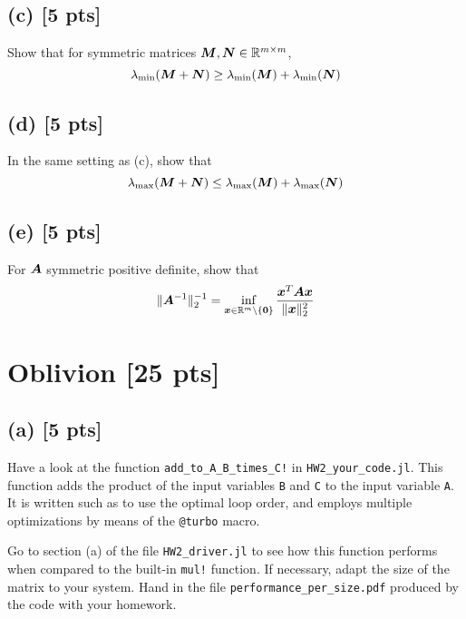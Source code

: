 \documentclass[twoside,10pt]{article}
\begin{document}
\subsection*{(c) [5 pts]}

Show that for symmetric matrices $\bm{M}, \bm{N} \in \mathbb{R}^{m \times m}$, 
\begin{equation}
  \lambda_{\mathrm{min}}(\mtx{M} + \mtx{N}) \geq \lambda_{\mathrm{min}}\left(\mtx{M}\right) + \lambda_{\mathrm{min}}\left(\mtx{N}\right)
\end{equation}


\subsection*{(d) [5 pts]}
In the same setting as (c), show that 
\begin{equation}
  \lambda_{\mathrm{max}}(\mtx{M} + \mtx{N}) \leq \lambda_{\mathrm{max}}\left(\mtx{M}\right) + \lambda_{\mathrm{max}}\left(\mtx{N}\right)
\end{equation}


\subsection*{(e) [5 pts]}
For $\bm{A}$ symmetric positive definite, show that 
\begin{equation*}
  \|\bm{A}^{-1}\|_{2}^{-1} = \inf \limits_{\bm{x} \in \mathbb{R}^m \setminus \{\bm{0}\}} \frac{\bm{x}^T \bm{A} \bm{x}}{\|\bm{x}\|^2_2}
\end{equation*}

\section{Oblivion [25 pts]}
\subsection*{(a) [5 pts]} 
Have a look at the function \texttt{add\_to\_A\_B\_times\_C!} in \texttt{HW2\_your\_code.jl}. 
This function adds the product of the input variables \texttt{B} and \texttt{C} to the input variable \texttt{A}. 
It is written such as to use the optimal loop order, and employs multiple optimizations by means of the \texttt{@turbo} macro.

Go to section (a) of the file \texttt{HW2\_driver.jl} to see how this function performs when compared to the built-in \texttt{mul!} function. 
If necessary, adapt the size of the matrix to your system. 
Hand in the file \texttt{performance\_per\_size.pdf} produced by the code with your homework. 
\end{document}
